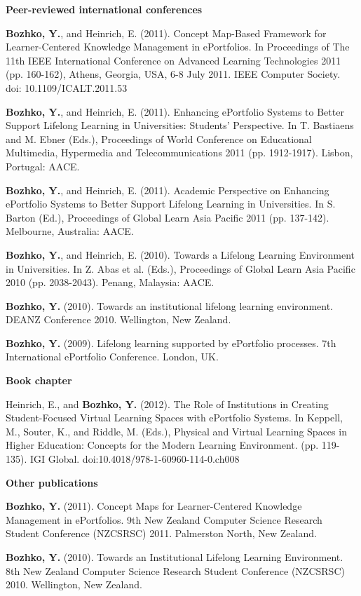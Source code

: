 \label{sec:pub}
\LARGE \textbf{Peer-reviewed international conferences}

\normalsize
\textbf{Bozhko, Y.}, and Heinrich, E. (2011). Concept Map-Based Framework for
Learner-Centered Knowledge Management in ePortfolios. In Proceedings of The 11th
IEEE International Conference on Advanced Learning Technologies 2011 (pp.
160-162), Athens, Georgia, USA, 6-8 July 2011. IEEE Computer Society. doi:
10.1109/ICALT.2011.53

\textbf{Bozhko, Y.}, and Heinrich, E. (2011). Enhancing ePortfolio Systems to
Better Support Lifelong Learning in Universities: Students' Perspective. In T.
Bastiaens and M. Ebner (Eds.), Proceedings of World Conference on Educational
Multimedia, Hypermedia and Telecommunications 2011 (pp. 1912-1917). Lisbon,
Portugal: AACE.

\textbf{Bozhko, Y.}, and Heinrich, E. (2011). Academic Perspective on Enhancing
ePortfolio Systems to Better Support Lifelong Learning in Universities. In S.
Barton (Ed.), Proceedings of Global Learn Asia Pacific 2011 (pp. 137-142).
Melbourne, Australia: AACE.

﻿\textbf{Bozhko, Y.}, and Heinrich, E. (2010). Towards a Lifelong Learning
Environment in Universities. In Z. Abas et al. (Eds.), Proceedings of Global
Learn Asia Pacific 2010 (pp. 2038-2043). Penang, Malaysia: AACE. 

\textbf{Bozhko, Y.} (2010). Towards an institutional lifelong learning
environment. DEANZ Conference 2010. Wellington, New Zealand.

\textbf{Bozhko, Y.} (2009). Lifelong learning supported by ePortfolio processes.
7th International ePortfolio Conference. London, UK.

\LARGE \textbf{Book chapter}

\normalsize
Heinrich, E., and \textbf{Bozhko, Y.} (2012). The Role of Institutions in Creating
Student-Focused Virtual Learning Spaces with ePortfolio Systems. In Keppell, M.,
Souter, K., and Riddle, M. (Eds.), Physical and Virtual Learning Spaces in
Higher Education: Concepts for the Modern Learning Environment. (pp. 119-135). 
IGI Global. doi:10.4018/978-1-60960-114-0.ch008

\LARGE \textbf{Other publications}

\normalsize
\textbf{Bozhko, Y.} (2011). Concept Maps for Learner-Centered Knowledge
Management in ePortfolios. 9th New Zealand Computer Science Research Student Conference
(NZCSRSC) 2011. Palmerston North, New Zealand.

\textbf{Bozhko, Y.} (2010). Towards an Institutional Lifelong Learning
Environment. 8th New Zealand Computer Science Research Student Conference (NZCSRSC) 2010.
Wellington, New Zealand.




